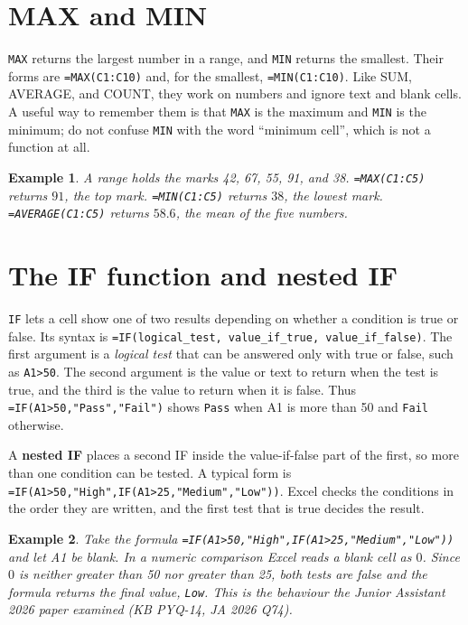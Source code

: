 \documentclass[11pt]{article}
\newtheorem{example}{Example}[section]
\begin{document}
\section{MAX and MIN}
\texttt{MAX} returns the largest number in a range, and \texttt{MIN} returns
the smallest. Their forms are \texttt{=MAX(C1:C10)} and, for the smallest,
\texttt{=MIN(C1:C10)}. Like SUM, AVERAGE, and COUNT, they work on numbers and
ignore text and blank cells. A useful way to remember them is that \texttt{MAX}
is the maximum and \texttt{MIN} is the minimum; do not confuse \texttt{MIN}
with the word ``minimum cell'', which is not a function at all.

\begin{example}
A range holds the marks 42, 67, 55, 91, and 38. \texttt{=MAX(C1:C5)} returns
$91$, the top mark. \texttt{=MIN(C1:C5)} returns $38$, the lowest mark.
\texttt{=AVERAGE(C1:C5)} returns $58.6$, the mean of the five numbers.
\end{example}

\section{The IF function and nested IF}
\texttt{IF} lets a cell show one of two results depending on whether a
condition is true or false. Its syntax is
\texttt{=IF(logical\_test, value\_if\_true, value\_if\_false)}. The first
argument is a \emph{logical test} that can be answered only with true or
false, such as \texttt{A1>50}. The second argument is the value or text to
return when the test is true, and the third is the value to return when it is
false. Thus \texttt{=IF(A1>50,"Pass","Fail")} shows \texttt{Pass} when A1 is
more than 50 and \texttt{Fail} otherwise.

A \textbf{nested IF} places a second IF inside the value-if-false part of the
first, so more than one condition can be tested. A typical form is
\texttt{=IF(A1>50,"High",IF(A1>25,"Medium","Low"))}. Excel checks the
conditions in the order they are written, and the first test that is true
decides the result.

\begin{example}
Take the formula \texttt{=IF(A1>50,"High",IF(A1>25,"Medium","Low"))} and let
A1 be blank. In a numeric comparison Excel reads a blank cell as $0$. Since
$0$ is neither greater than 50 nor greater than 25, both tests are false and
the formula returns the final value, \texttt{Low}. This is the behaviour the
Junior Assistant 2026 paper examined (KB PYQ-14, JA 2026 Q74).
\end{example}
\end{document}
